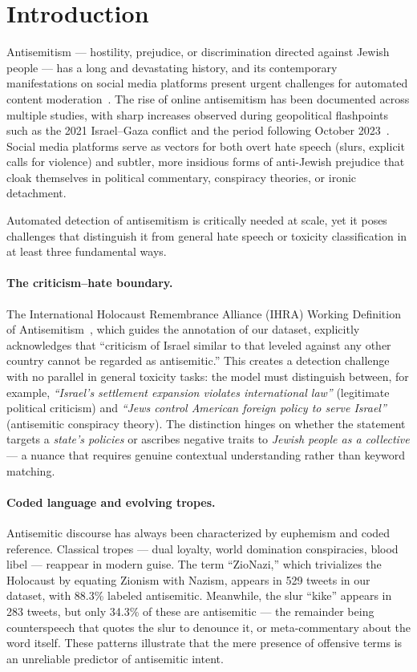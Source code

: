 \section{Introduction}
\label{sec:introduction}

Antisemitism --- hostility, prejudice, or discrimination directed against Jewish people --- has a long and devastating history, and its contemporary manifestations on social media platforms present urgent challenges for automated content moderation~\citep{becker2025decoding}. The rise of online antisemitism has been documented across multiple studies, with sharp increases observed during geopolitical flashpoints such as the 2021 Israel--Gaza conflict and the period following October 2023~\citep{jikeli2023antisemitic}. Social media platforms serve as vectors for both overt hate speech (slurs, explicit calls for violence) and subtler, more insidious forms of anti-Jewish prejudice that cloak themselves in political commentary, conspiracy theories, or ironic detachment.

Automated detection of antisemitism is critically needed at scale, yet it poses challenges that distinguish it from general hate speech or toxicity classification in at least three fundamental ways.

\paragraph{The criticism--hate boundary.}
The International Holocaust Remembrance Alliance (IHRA) Working Definition of Antisemitism~\citep{ihra2016working}, which guides the annotation of our dataset, explicitly acknowledges that ``criticism of Israel similar to that leveled against any other country cannot be regarded as antisemitic.'' This creates a detection challenge with no parallel in general toxicity tasks: the model must distinguish between, for example, \emph{``Israel's settlement expansion violates international law''} (legitimate political criticism) and \emph{``Jews control American foreign policy to serve Israel''} (antisemitic conspiracy theory). The distinction hinges on whether the statement targets a \emph{state's policies} or ascribes negative traits to \emph{Jewish people as a collective} --- a nuance that requires genuine contextual understanding rather than keyword matching.

\paragraph{Coded language and evolving tropes.}
Antisemitic discourse has always been characterized by euphemism and coded reference. Classical tropes --- dual loyalty, world domination conspiracies, blood libel --- reappear in modern guise. The term ``ZioNazi,'' which trivializes the Holocaust by equating Zionism with Nazism, appears in 529 tweets in our dataset, with 88.3\% labeled antisemitic. Meanwhile, the slur ``kike'' appears in 283 tweets, but only 34.3\% of these are antisemitic --- the remainder being counterspeech that quotes the slur to denounce it, or meta-commentary about the word itself. These patterns illustrate that the mere presence of offensive terms is an unreliable predictor of antisemitic intent.

